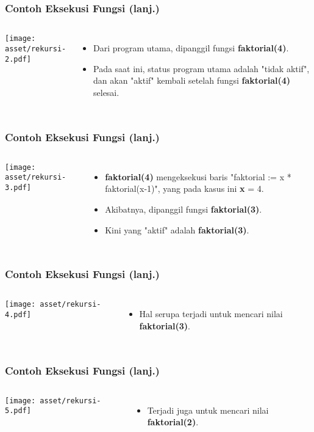 \begin{frame}
\frametitle{Contoh Eksekusi Fungsi (lanj.)}
\begin{columns}
    \centering
    \texttt{[image: asset/rekursi-2.pdf]}
    \begin{itemize}
      \item Dari program utama, dipanggil fungsi \textbf{faktorial(4)}.
      \item Pada saat ini, status program utama adalah "tidak aktif", dan akan "aktif" kembali setelah fungsi \textbf{faktorial(4)} selesai.
    \end{itemize}
  \end{columns} 
\end{frame}

\begin{frame}
\frametitle{Contoh Eksekusi Fungsi (lanj.)}
\begin{columns}
    \centering
    \texttt{[image: asset/rekursi-3.pdf]}
    \begin{itemize}
      \item \textbf{faktorial(4)} mengeksekusi baris "faktorial := x * faktorial(x-1)", yang pada kasus ini \textbf{x} = 4.
      \item Akibatnya, dipanggil fungsi \textbf{faktorial(3)}. 
      \item Kini yang "aktif" adalah \textbf{faktorial(3)}.
    \end{itemize}
  \end{columns} 
\end{frame}

\begin{frame}
\frametitle{Contoh Eksekusi Fungsi (lanj.)}
\begin{columns}
    \centering
    \texttt{[image: asset/rekursi-4.pdf]}
    \begin{itemize}
      \item Hal serupa terjadi untuk mencari nilai \textbf{faktorial(3)}.
    \end{itemize}
  \end{columns} 
\end{frame}

\begin{frame}
\frametitle{Contoh Eksekusi Fungsi (lanj.)}
\begin{columns}
    \centering
    \texttt{[image: asset/rekursi-5.pdf]}
    \begin{itemize}
      \item Terjadi juga untuk mencari nilai \textbf{faktorial(2)}.
    \end{itemize}
  \end{columns} 
\end{frame}

